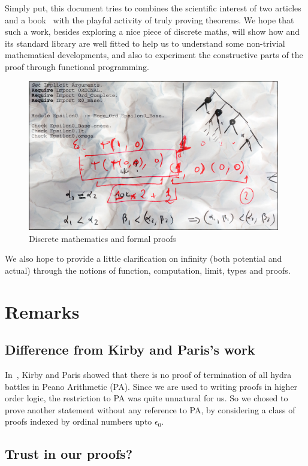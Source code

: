 \documentclass[a4paper]{book}
\begin{document}
Simply put, this document tries to combines the scientific interest of two articles~\cite{KP82, KS81} and a book~\cite{schutte} with the playful activity of truly proving theorems.
We hope  that such a work, besides exploring a nice piece of discrete maths, 
will show how \coq{} and its standard library are well fitted to help us to understand some non-trivial mathematical developments, and also to experiment the constructive parts of  the proof through functional programming.


\begin{figure}[h]
  \centering
  \includegraphics[width=11cm]{epsilon0.jpg}
  \caption{Discrete mathematics and formal proofs}
  \label{fig:gamma0}
\end{figure}
 We also hope to provide a little clarification on infinity (both potential and actual) through the notions of function, computation, limit,
 types and proofs.



\section{Remarks}

\subsection{Difference from Kirby and Paris's work}
In~\cite{KP82}, Kirby and Paris showed  that there is no proof of termination of all hydra battles in Peano Arithmetic (PA).
Since we are used to writing proofs in higher order logic, the restriction to PA was quite unnatural for us. So we chosed to prove another statement without any reference to PA, by considering a class of proofs indexed by ordinal numbers upto $\epsilon_0$.

\subsection{Trust in our proofs?}
\label{sect:trust-in-proofs}
\end{document}
